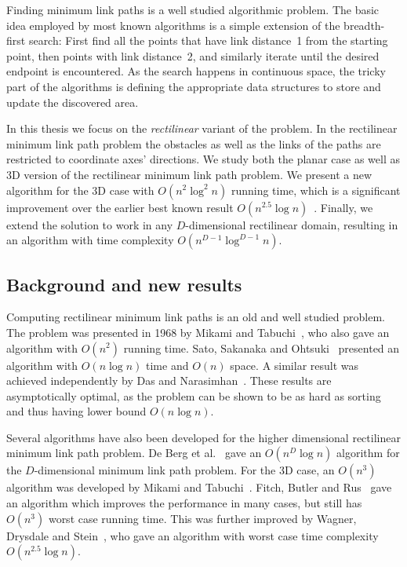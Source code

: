 \documentclass[english,gradu]{tktltiki2018}
\begin{document}
Finding minimum link paths is a well studied algorithmic problem\cite{restricted,wagner,dasnar,de1991,de1992,fitch,handbook}.
The basic idea employed by most known algorithms is a simple extension of the breadth-first search:
First find all the points that have link distance~1 from the starting point, then points with link distance~2, and similarly iterate until the desired endpoint is encountered.
As the search happens in continuous space, the tricky part of the algorithms is defining the appropriate data structures to store and update the discovered area.

In this thesis we focus on the \emph{rectilinear} variant of the problem.
In the rectilinear minimum link path problem the obstacles as well as the links of the paths are restricted to coordinate axes' directions.
We study both the planar case as well as 3D version of the rectilinear minimum link path problem.
We present a new algorithm for the 3D case with $O(n^2\log^2n)$ running time, which is a significant improvement over the earlier best known result $O(n^{2.5}\log n)$~\cite{restricted}.
Finally, we extend the solution to work in any $D$-dimensional rectilinear domain, resulting in an algorithm with time complexity $O(n^{D-1}\log^{D-1}n)$.

\subsection{Background and new results}

Computing rectilinear minimum link paths is an old and well studied problem.
The problem was presented in 1968 by Mikami and Tabuchi~\cite{mikami}, who also gave an algorithm with $O(n^2)$ running time.
Sato, Sakanaka and Ohtsuki~\cite{sato} presented an algorithm with $O(n\log n)$ time and $O(n)$ space.
A similar result was achieved independently by Das and Narasimhan~\cite{dasnar}.
These results are asymptotically optimal, as the problem can be shown to be as hard as sorting~\cite{dasnar} and thus having lower bound $O(n\log n)$.

Several algorithms have also been developed for the higher dimensional rectilinear minimum link path problem.
De Berg et al.~\cite{de1992} gave an $O(n^D\log n)$ algorithm for the $D$-dimensional minimum link path problem.
For the 3D case, an $O(n^3)$ algorithm was developed by Mikami and Tabuchi~\cite{mikami}.
Fitch, Butler and Rus~\cite{fitch} gave an algorithm which improves the performance in many cases, but still has $O(n^3)$ worst case running time.
This was further improved by Wagner, Drysdale and Stein~\cite{wagner}, who gave an algorithm with worst case time complexity $O(n^{2.5}\log n)$.
\end{document}
